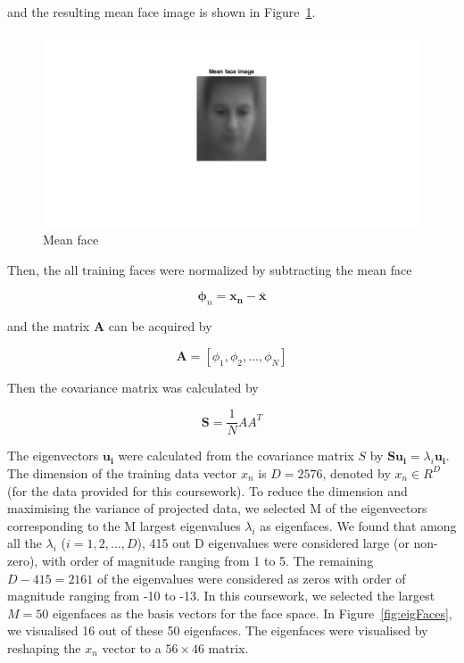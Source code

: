 \documentclass[10pt,twocolumn,letterpaper]{article}
\begin{document}
and the resulting mean face image is shown in Figure~\ref{fig:q1_meanface}. 


\begin{figure}[H]
	\begin{center}
		\includegraphics[width=0.8\linewidth]{q1_meanface}
		\caption{Mean face}
	\end{center}
	\label{fig:q1_meanface}
\end{figure}


Then, the all training faces were normalized by subtracting the mean face

\begin{equation}
\boldsymbol{\phi}_n = \boldsymbol{x_n} - \boldsymbol{\bar{x}}
\label{eq:q1_phi}
\end{equation}

and the matrix $\boldsymbol{A}$ can be acquired by

\begin{equation}
\boldsymbol{A} = [\phi_1, \phi_2, ..., \phi_N]
\label{eq:q1_A}
\end{equation}

Then the covariance matrix was calculated by

\begin{equation}
	\boldsymbol{S} = \frac{1}{N} A A^T
	\label{eq:q1_S}
\end{equation}

The eigenvectors $\boldsymbol{u_i}$ were calculated from the covariance matrix $S$ by $\boldsymbol{S u_i} = \lambda_i \boldsymbol{u_i}$. The dimension of the training data vector $x_n$ is $D = 2576$, denoted by $x_n \in R^D$ (for the data provided for this coursework). To reduce the dimension and maximising the variance of projected data, we selected M of the eigenvectors corresponding to the M largest eigenvalues $\lambda_i$ as eigenfaces. We found that among all the $\lambda_i$ ($i = 1,2, ..., D$), 415 out D eigenvalues were considered large (or non-zero), with order of magnitude ranging from 1 to 5. The remaining $D - 415 = 2161$ of the eigenvalues were considered as zeros with order of magnitude ranging from -10 to -13. In this coursework, we selected the largest $M = 50$ eigenfaces as the basis vectors for the face space. In Figure~\ref{fig:eigFaces}, we visualised 16 out of these 50 eigenfaces. The eigenfaces were visualised by reshaping the $x_n$ vector to a $56 \times 46$ matrix.
\end{document}
